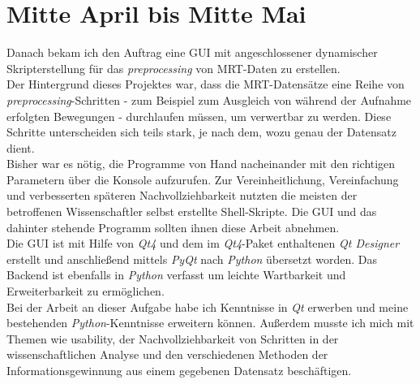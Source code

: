 \documentclass[a4paper,10pt]{article}
\begin{document}
\section{Mitte April bis Mitte Mai}
Danach bekam ich den Auftrag eine GUI mit angeschlossener dynamischer Skripterstellung für das \emph{preprocessing} von MRT-Daten zu erstellen.\\
Der Hintergrund dieses Projektes war, dass die MRT-Datensätze eine Reihe von \emph{preprocessing}-Schritten - zum Beispiel zum Ausgleich von während der Aufnahme erfolgten Bewegungen - durchlaufen müssen, um verwertbar zu werden. Diese Schritte unterscheiden sich teils stark, je nach dem, wozu genau der Datensatz dient.\\
Bisher war es nötig, die Programme von Hand nacheinander mit den richtigen Parametern über die Konsole aufzurufen. Zur Vereinheitlichung, Vereinfachung und verbesserten späteren Nachvollziehbarkeit nutzten die meisten der betroffenen Wissenschaftler selbst erstellte Shell-Skripte. Die GUI und das dahinter stehende Programm sollten ihnen diese Arbeit abnehmen.\\
Die GUI ist mit Hilfe von \emph{Qt4} und dem im \emph{Qt4}-Paket enthaltenen \emph{Qt Designer} erstellt und anschließend mittels \emph{PyQt} nach \emph{Python} übersetzt worden. Das Backend ist ebenfalls in \emph{Python} verfasst um leichte Wartbarkeit und Erweiterbarkeit zu ermöglichen.\\
Bei der Arbeit an dieser Aufgabe habe ich Kenntnisse in \emph{Qt} erwerben und meine bestehenden \emph{Python}-Kenntnisse erweitern können. Außerdem musste ich mich mit Themen wie usability, der Nachvollziehbarkeit von Schritten in der wissenschaftlichen Analyse und den verschiedenen Methoden der Informationsgewinnung aus einem gegebenen Datensatz beschäftigen.\\
\end{document}
